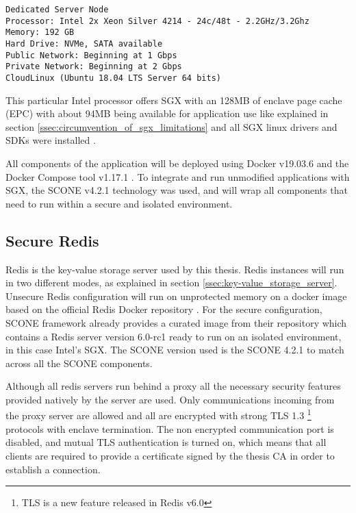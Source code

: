 \lstset{numbers=none, caption=Machine Specifications, label=lst:machine_specs}
\label{lst:ovh_machine_specs}
\begin{lstlisting}
Dedicated Server Node
Processor: Intel 2x Xeon Silver 4214 - 24c/48t - 2.2GHz/3.2Ghz
Memory: 192 GB
Hard Drive: NVMe, SATA available
Public Network: Beginning at 1 Gbps
Private Network: Beginning at 2 Gbps
CloudLinux (Ubuntu 18.04 LTS Server 64 bits)
\end{lstlisting}

This particular Intel processor offers \gls{SGX} with an 128\gls{MB} of enclave page cache (\gls{EPC}) with about 94\gls{MB} being available for application use like explained in section \ref{ssec:circumvention_of_sgx_limitations} and all \gls{SGX} linux drivers and \glspl{SDK} were installed \cite{sgx_drivers:1, sgx_sdk:1}.

All components of the application will be deployed using Docker v19.03.6 \cite{docker:1} and the Docker Compose tool v1.17.1 \cite{docker-compose:1}. To integrate and run unmodified applications with \gls{SGX}, the SCONE v4.2.1 \cite{scone:1} technology was used, and will wrap all components that need to run within a secure and isolated environment.

\subsection{Secure Redis}
\label{ssec:secure_redis}

Redis \cite{redis:1} is the key-value storage server used by this thesis. Redis instances will run in two different modes, as explained in section \ref{ssec:key-value_storage_server}. Unsecure Redis configuration will run on unprotected memory on a docker image based on the official Redis Docker repository \cite{redis:6}. For the secure configuration, SCONE framework already provides a curated image from their repository which contains a Redis server version 6.0-rc1 ready to run on an isolated environment, in this case Intel's SGX. The SCONE version used is the SCONE 4.2.1 to match across all the SCONE components.

Although all redis servers run behind a proxy all the necessary security features provided natively by the server are used. Only communications incoming from the proxy server are allowed and all are encrypted with strong \gls{TLS} 1.3 \footnote{TLS is a new feature released in Redis v6.0} protocols with enclave termination. The non encrypted communication port is disabled, and mutual \gls{TLS} authentication is turned on, which means that all clients are required to provide a certificate signed by the thesis CA in order to establish a connection.

